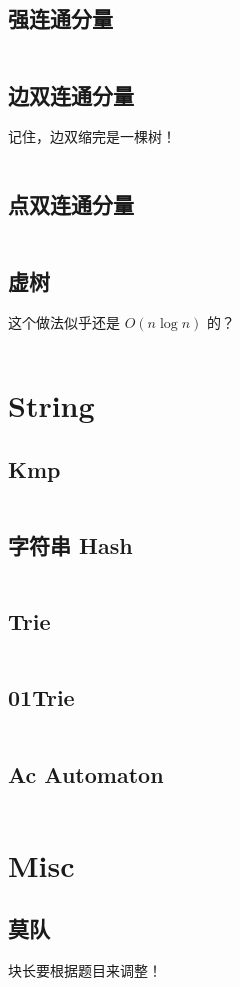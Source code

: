 \documentclass[titlepage, a4paper]{article}
\begin{document}
\begin{multicols}{2}
\begin{spacing}{0.6}
			 	\subsection{强连通分量}
			 		\inputminted{cpp}{src/Graph/Tarjan_scc.cpp}
			 	\subsection{边双连通分量}
			 		记住，边双缩完是一棵树！
			 		\inputminted{cpp}{src/Graph/Tarjan_edcc.cpp}
			 	\subsection{点双连通分量}
			 		\inputminted{cpp}{src/Graph/Tarjan_vdcc.cpp}
			 	\subsection{虚树}
			 		这个做法似乎还是 $O(n \log n)$ 的？
			 		\inputminted{cpp}{src/Graph/Virtual_tree.cpp}
			 \section{String}
			 	\subsection{Kmp}
			 		\inputminted{cpp}{src/String/Kmp.cpp}
			 	\subsection{字符串 Hash}
			 		\inputminted{cpp}{src/String/String_hash.cpp}
			 	\subsection{Trie}
			 		\inputminted{cpp}{src/String/Trie.cpp}
			 	\subsection{01Trie}
			 		\inputminted{cpp}{src/String/01_trie.cpp}
			 	\subsection{Ac Automaton}
			 		\inputminted{cpp}{src/String/Ac_automaton.cpp}
			 \section{Misc}
			 	\subsection{莫队}
			 		块长要根据题目来调整！
			 		\inputminted{cpp}{src/Misc/Mo.cpp}

\end{spacing}
\end{multicols}
\end{document}
